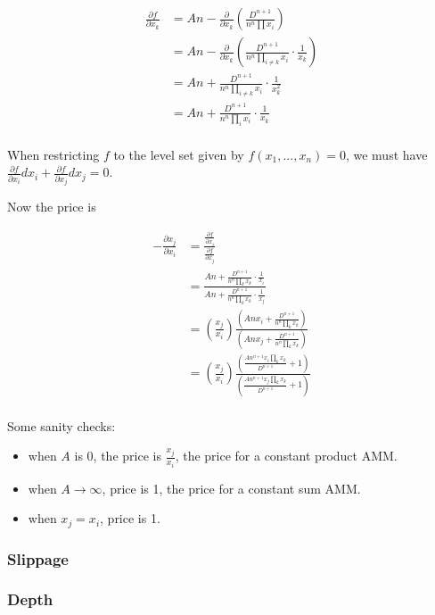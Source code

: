 \documentclass[
]{article}
\providecommand{\tightlist}{%
  \setlength{\itemsep}{0pt}\setlength{\parskip}{0pt}}
\begin{document}
\[\begin{aligned}
\frac{\partial f}{\partial x_k} &= A n - \frac{\partial}{\partial x_k}\left(\frac{D^{n+1}}{n^n \prod x_i}\right) \\
&= A n -  \frac{\partial}{\partial x_k}\left(\frac{D^{n+1}}{n^n \prod_{i\neq k} x_i} \cdot \frac{1}{x_k}\right)\\
&= A n + \frac{D^{n+1}}{n^n \prod_{i\neq k} x_i} \cdot \frac{1}{x_k^2} \\
&= A n + \frac{D^{n+1}}{n^n \prod_{i} x_i} \cdot \frac{1}{x_k} \\
\end{aligned}\]

When restricting \(f\) to the level set given by
\(f(x_1, ..., x_n) = 0\), we must have
\(\frac{\partial f}{\partial x_i} dx_i + \frac{\partial f}{\partial x_j} dx_j = 0\).

Now the price is

\[\begin{aligned}
- \frac{\partial x_j}{\partial x_i} &= \frac{\frac{\partial f}{\partial x_i}}{\frac{\partial f}{\partial x_j}}\\[1.2ex]
&= \frac{A n + \frac{D^{n+1}}{n^n \prod_{k} x_k} \cdot \frac{1}{x_i}}{A n + \frac{D^{n+1}}{n^n \prod_{k} x_k} \cdot \frac{1}{x_j}} \\[1.2ex]
&= \left( \frac{x_j}{x_i} \right) \frac{\left(A n x_i + \frac{D^{n+1}}{n^n \prod_{k} x_k}\right)}{\left(A n x_j + \frac{D^{n+1}}{n^n \prod_{k} x_k}\right)} \\[1.0ex]
&= \left( \frac{x_j}{x_i} \right) \frac{\left(\frac{A n^{n+1} x_i \prod_k x_k}{D^{n+1}} + 1 \right)}{\left(\frac{A n^{n+1} x_j \prod_k x_k}{D^{n+1}} + 1 \right)} \\[1.0ex]
\end{aligned}\]

Some sanity checks:

\begin{itemize}
\tightlist
\item
  when \(A\) is 0, the price is \(\frac{x_j}{x_i}\), the price for a
  constant product AMM.
\item
  when \(A \rightarrow \infty\), price is 1, the price for a constant
  sum AMM.
\item
  when \(x_j = x_i\), price is 1.
\end{itemize}

\hypertarget{slippage}{%
\subsubsection{Slippage}\label{slippage}}

\hypertarget{depth}{%
\subsubsection{Depth}\label{depth}}
\end{document}
